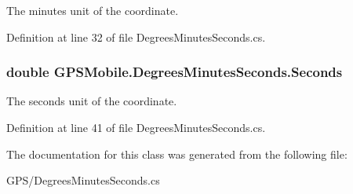 The minutes unit of the coordinate. 

Definition at line 32 of file DegreesMinutesSeconds.cs.\hypertarget{class_g_p_s_mobile_1_1_degrees_minutes_seconds_aba3b082a41209eaffe829426d760bc5a}{
\subsubsection[{Seconds}]{\setlength{\rightskip}{0pt plus 5cm}double GPSMobile.DegreesMinutesSeconds.Seconds}}
\label{class_g_p_s_mobile_1_1_degrees_minutes_seconds_aba3b082a41209eaffe829426d760bc5a}


The seconds unit of the coordinate. 

Definition at line 41 of file DegreesMinutesSeconds.cs.

The documentation for this class was generated from the following file:\begin{DoxyCompactItemize}
\item 
GPS/DegreesMinutesSeconds.cs\end{DoxyCompactItemize}
